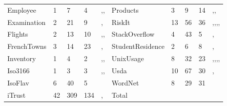 \begin{table*}[t]
\begin{tabular}{llllllllll}
Employee&1&7&4&\cite{mcminn2016virtual},\cite{kapfhammer2013search},\cite{mcminn2015effectiveness}&Products&3&9&14&\cite{mcminn2016virtual},\cite{kapfhammer2013search},\cite{mcminn2015effectiveness}\\
Examination&2&21&9&\cite{kapfhammer2013search},\cite{mcminn2015effectiveness}&RiskIt&13&56&36&\cite{kapfhammer2013search},\cite{wright2013efficient},\cite{wright2014impact},\cite{mcminn2015effectiveness},\cite{kinneer2015automatically} \\
Flights&2&13&10&\cite{kapfhammer2013search},\cite{wright2014impact},\cite{mcminn2015effectiveness}&StackOverflow&4&43&5&\cite{wright2014impact},\cite{mcminn2015effectiveness} \\
FrenchTowns&3&14&23&\cite{kapfhammer2013search},\cite{mcminn2015effectiveness}&StudentResidence&2&6&8&\cite{kapfhammer2013search},\cite{mcminn2015effectiveness} \\
Inventory&1&4&2&\cite{mcminn2016virtual},\cite{kapfhammer2013search},\cite{mcminn2015effectiveness}&UnixUsage&8&32&23&\cite{kapfhammer2013search},\cite{wright2013efficient},\cite{wright2014impact},\cite{mcminn2015effectiveness},\cite{kinneer2015automatically} \\
Iso3166&1&3&3&\cite{mcminn2016virtual},\cite{kapfhammer2013search},\cite{mcminn2015effectiveness}&Usda&10&67&30&\cite{kapfhammer2013search},\cite{mcminn2015effectiveness}  \\
IsoFlav&6&40&5&\cite{wright2014impact}&WordNet&8&29&31&\cite{wright2014impact} \\
iTrust&42&309&134&\cite{mcminn2015effectiveness},\cite{kinneer2015automatically}&Total&&&&
\end{tabular}
\end{table*}
